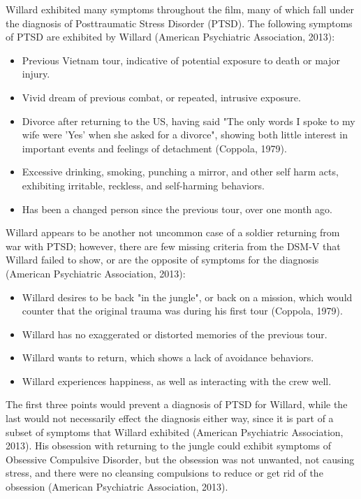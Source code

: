 \documentclass[a4paper,man,natbib]{apa6}
\begin{document}
Willard exhibited many symptoms throughout the film, many of which fall under the diagnosis of Posttraumatic Stress Disorder (PTSD). The following symptoms of PTSD are exhibited by Willard (American Psychiatric Association, 2013):
\begin{itemize}
\item Previous Vietnam tour, indicative of potential exposure to death or major injury.
\item Vivid dream of previous combat, or repeated, intrusive exposure.
\item Divorce after returning to the US, having said "The only words I spoke to my wife were 'Yes' when she asked for a divorce", showing both little interest in important events and feelings of detachment (Coppola, 1979).
\item Excessive drinking, smoking, punching a mirror, and other self harm acts, exhibiting irritable, reckless, and self-harming behaviors.
\item Has been a changed person since the previous tour, over one month ago.
\end{itemize} 
Willard appears to be another not uncommon case of a soldier returning from war with PTSD; however, there are few missing criteria from the DSM-V that Willard failed to show, or are the opposite of symptoms for the diagnosis (American Psychiatric Association, 2013):
\begin{itemize}
\item Willard desires to be back "in the jungle", or back on a mission, which would counter that the original trauma was during his first tour (Coppola, 1979).
\item Willard has no exaggerated or distorted memories of the previous tour.
\item Willard wants to return, which shows a lack of avoidance behaviors.
\item Willard experiences happiness, as well as interacting with the crew well.
\end{itemize}
The first three points would prevent a diagnosis of PTSD for Willard, while the last would not necessarily effect the diagnosis either way, since it is part of a subset of symptoms that Willard exhibited (American Psychiatric Association, 2013). His obsession with returning to the jungle could exhibit symptoms of Obsessive Compulsive Disorder, but the obsession was not unwanted, not causing stress, and there were no cleansing compulsions to reduce or get rid of the obsession (American Psychiatric Association, 2013).
\end{document}
